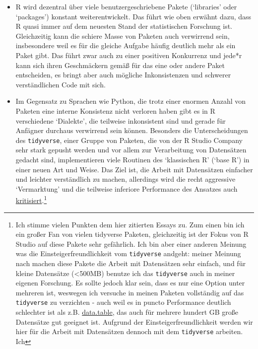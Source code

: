 \documentclass[]{book}
\let\rmarkdownfootnote\footnote%
\def\footnote{\protect\rmarkdownfootnote}
\begin{document}
\begin{itemize}
\item
  R wird dezentral über viele benutzergeschriebene Pakete (`libraries'
  oder `packages') konstant weiterentwickelt. Das führt wie oben erwähnt
  dazu, dass R quasi immer auf dem neuesten Stand der statistischen
  Forschung ist. Gleichzeitig kann die schiere Masse von Paketen auch
  verwirrend sein, insbesondere weil es für die gleiche Aufgabe häufig
  deutlich mehr als ein Paket gibt. Das führt zwar auch zu einer
  positiven Konkurrenz und jede*r kann sich ihren Geschmäckern gemäß für
  das eine oder andere Paket entscheiden, es bringt aber auch mögliche
  Inkonsistenzen und schwerer verständlichen Code mit sich.
\item
  Im Gegensatz zu Sprachen wie Python, die trotz einer enormen Anzahl
  von Paketen eine interne Konsistenz nicht verloren haben gibt es in R
  verschiedene `Dialekte', die teilweise inkonsistent sind und gerade
  für Anfägner durchaus verwirrend sein können. Besonders die
  Unterscheidungen des \texttt{tidyverse}, einer Gruppe von Paketen, die
  von der R Studio Company sehr stark gepusht werden und vor allem zur
  Verarbeitung von Datensätzen gedacht sind, implementieren viele
  Routinen des `klassischen R' (`base R') in einer neuen Art und Weise.
  Das Ziel ist, die Arbeit mit Datensätzen einfacher und leichter
  verständlich zu machen, allerdings wird die recht aggressive
  `Vermarktung' und die teilweise inferiore Performance des Ansatzes
  auch
  \href{https://github.com/matloff/TidyverseSkeptic}{kritisiert}.\footnote{Ich
    stimme vielen Punkten dem hier zitierten Essays zu. Zum einen bin
    ich ein großer Fan von vielen tidyverse Paketen, gleichzeitig ist
    der Fokus von R Studio auf diese Pakete sehr gefährlich. Ich bin
    aber einer anderen Meinung was die Einsteigerfreundlichkeit vom
    \texttt{tidyverse} andgeht: meiner Meinung nach machen diese Pakete
    die Arbeit mit Datensätzen sehr einfach, und für kleine Datensätze
    (\textless{}500MB) benutze ich das \texttt{tidyverse} auch in meiner
    eigenen Forschung. Es sollte jedoch klar sein, dass es nur eine
    Option unter mehreren ist, weswegen ich versuche in meinen Paketen
    vollständig auf das \texttt{tidyverse} zu verzichten - auch weil es
    in puncto Performance deutlich schlechter ist als z.B.
    \href{https://rdatatable.gitlab.io/data.table/}{data.table}, das
    auch für mehrere hundert GB große Datensätze gut geeignet ist.
    Aufgrund der Einsteigerfreundlichkeit werden wir hier für die Arbeit
    mit Datensätzen dennoch mit dem \texttt{tidyverse} arbeiten. Ich
}
\end{itemize}
\end{document}
